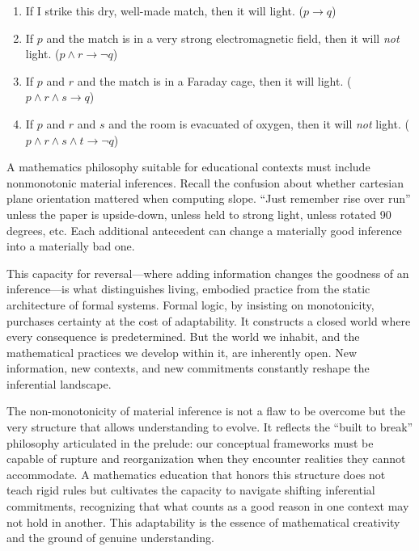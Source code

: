 \documentclass[12pt]{book}
\begin{document}
\begin{enumerate}
\def\labelenumi{\arabic{enumi}.}

\item
  If I strike this dry, well-made match, then it will light. (\(p \rightarrow q\))
\item
  If \(p\) and the match is in a very strong electromagnetic field, then it will \emph{not} light. (\(p \land r \rightarrow \neg q\))
\item
  If \(p\) and \(r\) and the match is in a Faraday cage, then it will light. (\(p \land r \land s \rightarrow q\))
\item
  If \(p\) and \(r\) and \(s\) and the room is evacuated of oxygen, then it will \emph{not} light. (\(p \land r \land s \land t \rightarrow \neg q\))
\end{enumerate}

A mathematics philosophy suitable for educational contexts must include nonmonotonic material inferences. Recall the confusion about whether cartesian plane orientation mattered when computing slope. ``Just remember rise over run'' unless the paper is upside-down, unless held to strong light, unless rotated 90 degrees, etc. Each additional antecedent can change a materially good inference into a materially bad one.

This capacity for reversal---where adding information changes the goodness of an inference---is what distinguishes living, embodied practice from the static architecture of formal systems. Formal logic, by insisting on monotonicity, purchases certainty at the cost of adaptability. It constructs a closed world where every consequence is predetermined. But the world we inhabit, and the mathematical practices we develop within it, are inherently open. New information, new contexts, and new commitments constantly reshape the inferential landscape.

The non-monotonicity of material inference is not a flaw to be overcome but the very structure that allows understanding to evolve. It reflects the ``built to break'' philosophy articulated in the prelude: our conceptual frameworks must be capable of rupture and reorganization when they encounter realities they cannot accommodate. A mathematics education that honors this structure does not teach rigid rules but cultivates the capacity to navigate shifting inferential commitments, recognizing that what counts as a good reason in one context may not hold in another. This adaptability is the essence of mathematical creativity and the ground of genuine understanding.
\end{document}
